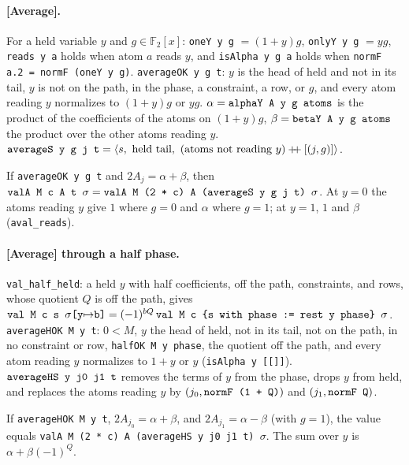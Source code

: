 \paragraph{[Average].} For a held variable $y$ and $g\in\mathbb F_2[x]$:
\textnormal{\texttt{oneY y g}} $=(1+y)g$, \textnormal{\texttt{onlyY y g}} $= yg$, \textnormal{\texttt{reads y a}} holds when atom $a$ reads
$y$, and \textnormal{\texttt{isAlpha y g a}} holds when \textnormal{\texttt{normF a.\allowbreak{}2 = normF (\allowbreak{}oneY y g)}}.
\textnormal{\texttt{averageOK y g t}}: $y$ is the head of held and not in its tail, $y$ is not on the path, in the
phase, a constraint, a row, or $g$, and every atom reading $y$ normalizes to $(1+y)g$ or $yg$.
$\alpha = \textnormal{\texttt{alphaY A y g atoms}}$ is the product of the coefficients of the atoms on $(1+y)g$,
$\beta = \textnormal{\texttt{betaY A y g atoms}}$ the product over the other atoms reading $y$.
$\textnormal{\texttt{averageS y g j t}} = \langle s,\ \text{held tail},\ (\text{atoms not reading }y)\mathbin{+\!\!+}[(j,g)]\rangle$.
\begin{theorem}
If \textnormal{\texttt{averageOK y g t}} and $2A_j = \alpha+\beta$, then
$\textnormal{\texttt{valA M c A t \ensuremath{\sigma}}} = \textnormal{\texttt{valA M (\allowbreak{}2 * c) A (\allowbreak{}averageS y g j t) \ensuremath{\sigma}}}$. At $y=0$ the atoms reading
$y$ give $1$ where $g=0$ and $\alpha$ where $g=1$; at $y=1$, $1$ and $\beta$ (\textnormal{\texttt{aval\_\allowbreak{}reads}}).
\end{theorem}

\paragraph{[Average] through a half phase.} \textnormal{\texttt{val\_\allowbreak{}half\_\allowbreak{}held}}: a held $y$ with half
coefficients, off the path, constraints, and rows, whose quotient $Q$ is off the path, gives
$\textnormal{\texttt{val M c s \ensuremath{\sigma}[y\ensuremath{\mapsto}b]}} = (-1)^{bQ}\,\textnormal{\texttt{val M c \{s with phase := rest y phase\} \ensuremath{\sigma}}}$.
\textnormal{\texttt{averageHOK M y t}}: $0<M$, $y$ the head of held, not in its tail, not on the path, in no
constraint or row, \textnormal{\texttt{halfOK M y phase}}, the quotient off the path, and every atom reading $y$
normalizes to $1+y$ or $y$ (\textnormal{\texttt{isAlpha y [[]]}}).
$\textnormal{\texttt{averageHS y j0 j1 t}}$ removes the terms of $y$ from the phase, drops $y$ from held, and
replaces the atoms reading $y$ by $(j_0, \textnormal{\texttt{normF (\allowbreak{}1 + Q)}})$ and $(j_1,\textnormal{\texttt{normF Q}})$.
\begin{theorem}
If \textnormal{\texttt{averageHOK M y t}}, $2A_{j_0} = \alpha+\beta$, and $2A_{j_1}=\alpha-\beta$ (with $g = 1$),
the value equals \textnormal{\texttt{valA M (\allowbreak{}2 * c) A (\allowbreak{}averageHS y j0 j1 t) \ensuremath{\sigma}}}. The sum over $y$ is
$\alpha+\beta(-1)^Q$.
\end{theorem}

